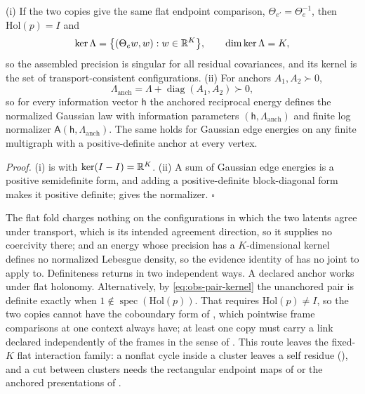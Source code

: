 (i) If the two copies give the same flat endpoint comparison,
\(\Theta_{e'}=\Theta_e^{-1}\), then \(\mathrm{Hol}(p)=I\) and
\begin{equation}
\ker\Lambda=\bigl\{(\Theta_ew,w):w\in\mathbb R^K\bigr\},
\qquad
\dim\ker\Lambda=K,
\label{eq:obs-cocycle-kernel}
\end{equation}
so the assembled precision is singular for all residual covariances, and its kernel is
the set of transport-consistent configurations.
(ii) For anchors \(A_1,A_2\succ0\),
\begin{equation}
\Lambda_{\mathrm{anch}}=\Lambda+\operatorname{diag}(A_1,A_2)\succ0,
\label{eq:obs-anchored-cycle}
\end{equation}
so for every information vector \(\mathsf h\) the anchored reciprocal energy defines the
normalized Gaussian law with information parameters \((\mathsf h,\Lambda_{\mathrm{anch}})\)
and finite log normalizer \(\mathsf A(\mathsf h,\Lambda_{\mathrm{anch}})\). The same holds for
Gaussian edge energies on any finite multigraph with a positive-definite anchor at every
vertex. 

\noindent\emph{Proof.}
(i) is  with \(\ker(I-I)=\mathbb R^K\). (ii) A sum of
Gaussian edge energies is a positive semidefinite form, and adding a positive-definite
block-diagonal form makes it positive definite; 
gives the normalizer. \hfill$\square$

\medskip
The flat fold charges nothing on the configurations in which the two latents agree under
transport, which is its intended agreement direction, so it supplies no coercivity
there; and an energy whose precision has a \(K\)-dimensional kernel defines no normalized
Lebesgue density, so the evidence identity of  has no joint to apply to.
Definiteness returns in two independent ways. A declared anchor works under flat
holonomy. Alternatively, by \eqref{eq:obs-pair-kernel} the unanchored pair is definite
exactly when \(1\notin\operatorname{spec}(\mathrm{Hol}(p))\). That requires
\(\mathrm{Hol}(p)\neq I\), so the two copies cannot have the coboundary form of
, which pointwise frame comparisons at one context
always have; at least one copy must carry a link declared independently of the frames in
the sense of . This route leaves the fixed-\(K\) flat interaction
family: a nonflat cycle inside a cluster leaves a self residue
(), and a cut between clusters needs the rectangular
endpoint maps of  or the anchored presentations
of .

